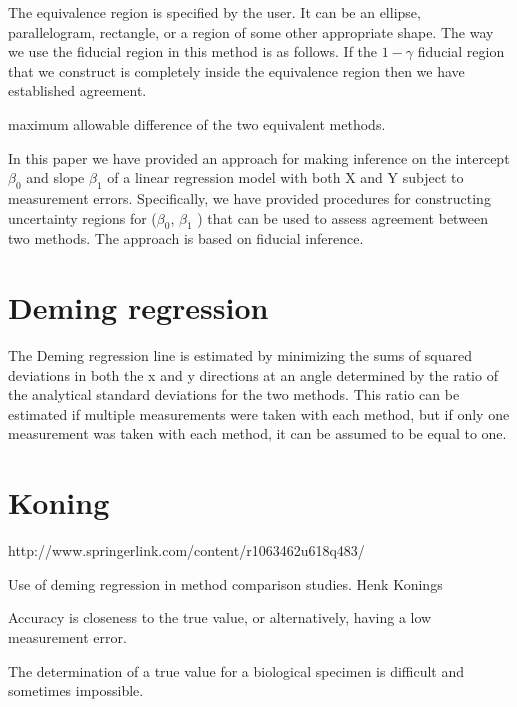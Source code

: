 \documentclass[MAIN.tex]{subfiles}
\begin{document}
The equivalence region is specified by the user. It can be an ellipse, parallelogram,
rectangle, or a region of some other appropriate shape. The way we use the fiducial region in this method is as follows. If
the $1−\gamma$ fiducial region that we construct is completely inside the equivalence region then we have established agreement.

maximum allowable difference of the two equivalent methods.

In this paper we have provided an approach for making inference on the intercept $\beta_0$ and slope $\beta_1$ of a linear regression
model with both X and Y subject to measurement errors. Specifically, we have provided procedures for constructing
uncertainty regions for ($\beta_0$, $\beta_1$ ) that can be used to assess agreement between two methods. The approach is based on
fiducial inference.



\section*{Deming regression}
The Deming regression line is estimated by minimizing the sums of squared deviations in both the x and y directions at an angle determined by the ratio of the analytical standard deviations for the two methods.
This ratio can be estimated if multiple measurements were taken with each method, but if only one measurement was taken with each method, it can be assumed to be equal to one.


\section*{Koning}
http://www.springerlink.com/content/r1063462u618q483/

Use of deming regression in method comparison studies.
Henk Konings

Accuracy is closeness to the true value, or alternatively, having a low measurement error.

The determination of a true value for a biological specimen is difficult and sometimes impossible.
\end{document}
